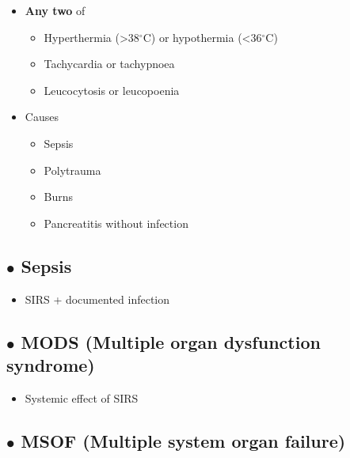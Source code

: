 \documentclass[
  14pt,
]{memoir}
\providecommand{\tightlist}{%
  \setlength{\itemsep}{0pt}\setlength{\parskip}{0pt}}
\begin{document}
\begin{itemize}
\tightlist
\item
  \textbf{Any two} of

  \begin{itemize}
  \tightlist
  \item
    Hyperthermia (\textgreater38\(^\circ\)C) or hypothermia
    (\textless36\(^\circ\)C)
  \item
    Tachycardia or tachypnoea
  \item
    Leucocytosis or leucopoenia
  \end{itemize}
\item
  Causes

  \begin{itemize}
  \tightlist
  \item
    Sepsis
  \item
    Polytrauma
  \item
    Burns
  \item
    Pancreatitis without infection
  \end{itemize}
\end{itemize}

\hypertarget{bullet-sepsis}{%
\subsection{\texorpdfstring{\(\bullet\)
Sepsis}{\textbackslash bullet Sepsis}}\label{bullet-sepsis}}

\begin{itemize}
\tightlist
\item
  SIRS + documented infection
\end{itemize}

\hypertarget{bullet-mods-multiple-organ-dysfunction-syndrome}{%
\subsection{\texorpdfstring{\(\bullet\) MODS (Multiple organ dysfunction
syndrome)}{\textbackslash bullet MODS (Multiple organ dysfunction syndrome)}}\label{bullet-mods-multiple-organ-dysfunction-syndrome}}

\begin{itemize}
\tightlist
\item
  Systemic effect of SIRS
\end{itemize}

\hypertarget{bullet-msof-multiple-system-organ-failure}{%
\subsection{\texorpdfstring{\(\bullet\) MSOF (Multiple system organ
failure)}{\textbackslash bullet MSOF (Multiple system organ failure)}}\label{bullet-msof-multiple-system-organ-failure}}
\end{document}
